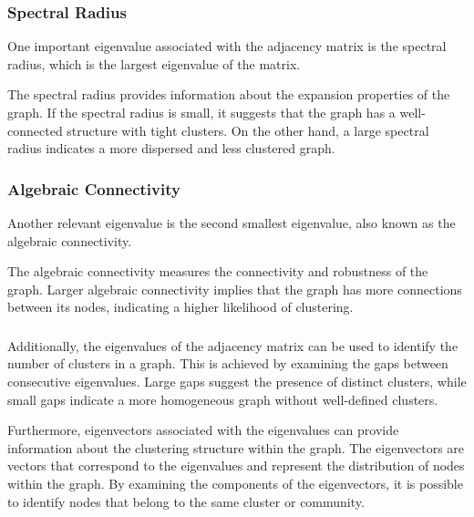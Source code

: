 \documentclass[12pt, a4paper]{article}
\begin{document}
\begin{flushleft}
        \subsubsection{Spectral Radius}
        \begin{flushleft}
        One important eigenvalue associated with the adjacency matrix is the spectral radius, which is the largest eigenvalue of the matrix.
        
        The spectral radius provides information about the expansion properties of the graph. If the spectral radius is small, it suggests that the graph has a well-connected structure with tight clusters. On the other hand, a large spectral radius indicates a more dispersed and less clustered graph.
        \end{flushleft}

        \subsubsection{Algebraic Connectivity}
        \begin{flushleft}
        Another relevant eigenvalue is the second smallest eigenvalue, also known as the algebraic connectivity.
            
        The algebraic connectivity measures the connectivity and robustness of the graph. Larger algebraic connectivity implies that the graph has more connections between its nodes, indicating a higher likelihood of clustering.
        \end{flushleft}
        \subsubsection*{}
        \begin{flushleft}
        Additionally, the eigenvalues of the adjacency matrix can be used to identify the number of clusters in a graph. This is achieved by examining the gaps between consecutive eigenvalues. Large gaps suggest the presence of distinct clusters, while small gaps indicate a more homogeneous graph without well-defined clusters.

        Furthermore, eigenvectors associated with the eigenvalues can provide information about the clustering structure within the graph. The eigenvectors are vectors that correspond to the eigenvalues and represent the distribution of nodes within the graph. By examining the components of the eigenvectors, it is possible to identify nodes that belong to the same cluster or community.
        \end{flushleft}


\end{flushleft}
\end{document}

